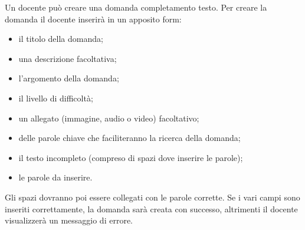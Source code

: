 \documentclass[a4paper, titlepage]{article}
\begin{document}
Un docente può creare una domanda completamento testo. Per creare la domanda il docente inserirà in un apposito form:
\begin{itemize}
	\item il titolo della domanda;
	\item una descrizione facoltativa; 
	\item l'argomento della domanda; 
	\item il livello di difficoltà;
	\item un allegato (immagine, audio o video) facoltativo;
	\item delle parole chiave che faciliteranno la ricerca della domanda;
	\item il testo incompleto (compreso di spazi dove inserire le parole);
	\item le parole da inserire. 
\end{itemize}
Gli spazi dovranno poi essere collegati con le parole corrette. Se i vari campi sono inseriti correttamente, la domanda sarà creata con successo, altrimenti il docente visualizzerà un messaggio di errore.
\end{document}
